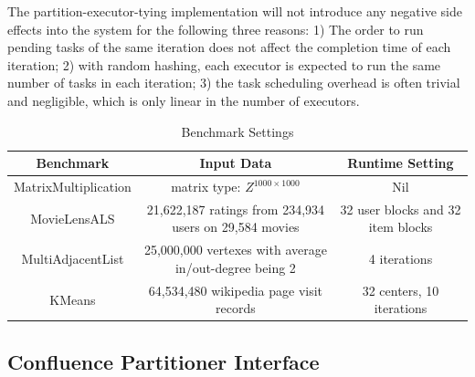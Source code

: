 \documentclass[10pt,journal,compsoc]{IEEEtran}
\begin{document}
The partition-executor-tying implementation will not introduce any negative
side effects into the system for the following three reasons: 1)  The
order to run pending tasks of the same iteration does not affect the
completion time of each iteration; 2) with random hashing, each executor
is expected to run the same number of tasks in each iteration;
3) the task scheduling overhead is often trivial and negligible, which
is only linear in the number of executors.


\begin{table}[!t]
\renewcommand{\arraystretch}{1}
\caption{Benchmark Settings}
\label{table:benchmark}
\centering
\begin{tabularx}{0.85\textwidth}{ c || c | c }
\hline
\textbf{Benchmark} & \textbf{Input Data} & \textbf{Runtime Setting} \\
\hline
MatrixMultiplication & matrix type: $Z^{1000 \times 1000}$ & Nil\\
\hline
MovieLensALS & 21,622,187 ratings from 234,934 users on 29,584 movies &32 user blocks and 32 item blocks\\%
\hline
MultiAdjacentList & 25,000,000 vertexes with average in/out-degree being 2& 4 iterations \\%
\hline
KMeans & 64,534,480 wikipedia page visit records& 32 centers, 10 iterations \\
\hline
\end{tabularx}
\end{table}


\subsection{Confluence Partitioner Interface}
\end{document}
